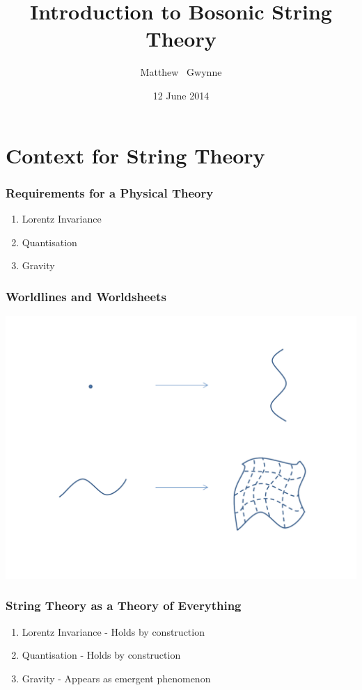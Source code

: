 \documentclass{beamer}
\title[String Theory]{Introduction to Bosonic String Theory}
\subtitle{}
\author[M.~Gwynne]{Matthew ~Gwynne}
\institute[U of York]{University of York, Department of Mathematics}
\date[12 June 2014]{12 June 2014}
\begin{document}
\begin{frame}
\titlepage
\end{frame}

\section{Context for String Theory}
\begin{frame}
\frametitle{Requirements for a Physical Theory}
\begin{enumerate}
\item{Lorentz Invariance}
\item{Quantisation}
\item{Gravity}
\end{enumerate}
\end{frame}


\begin{frame}
\frametitle{Worldlines and Worldsheets}
\includegraphics[width=\linewidth]{worldline2.pdf}
\end{frame}


\begin{frame}
\frametitle{String Theory as a Theory of Everything}

\begin{enumerate}
\item{Lorentz Invariance - Holds by construction}
\item{Quantisation - Holds by construction}
\item{Gravity - Appears as emergent phenomenon}
\end{enumerate}

\end{frame}
\end{document}

